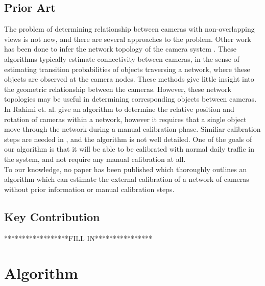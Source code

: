 \documentclass[journal]{IEEEtran}
\begin{document}
	\subsection{Prior Art}
		\indent The problem of determining relationship between cameras with non-overlapping views is not new, and there are several approaches to the problem. Other work has been done to infer the network topology of the camera system \cite{ellis2003,makris2004}. These algorithms typically estimate connectivity between cameras, in the sense of estimating transition probabilities of objects traversing a network, where these objects are observed at the camera nodes. These methods give little insight into the geometric relationship between the cameras. However, these network topologies may be useful in determining corresponding objects between cameras. \\
		\indent In \cite{rahimi2004} Rahimi et. al. give an algorithm to determine the relative position and rotation of cameras within a network, however it requires that a single object move through the network during a manual calibration phase. Similiar calibration steps are needed in \cite{knight2003}, and the algorithm is not well detailed. One of the goals of our algorithm is that it will be able to be calibrated with normal daily traffic in the system, and not require any manual calibration at all. \\
		\indent To our knowledge, no paper has been published which thoroughly outlines an algorithm which can estimate the external calibration of a network of cameras without prior information or manual calibration steps.
	\subsection{Key Contribution}
	******************FILL IN****************
	
\section{Algorithm}
\end{document}
